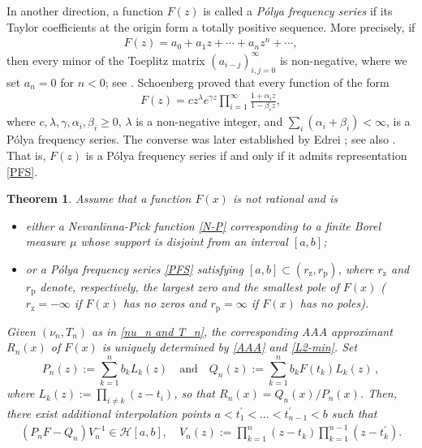 \documentclass[twoside,a4paper]{amsart}
\newtheorem{theorem}{Theorem}%
\theoremstyle{remark}
\begin{document}
In another direction, a function \( F(z) \) is called a \emph{P\'olya frequency series} if its Taylor coefficients at the origin form a totally positive sequence. More precisely, if
\begin{align}
\label{PFS-Taylor}
F(z) = a_0 + a_1z + \cdots + a_nz^n + \cdots,
\end{align}
then every minor of the Toeplitz matrix \( (a_{i-j})_{i,j=0}^\infty \) is non-negative, where we  set \( a_n=0\) for \( n<0\); see \cite{MR23309}. Schoenberg proved \cite{MR23309} that every function of the form
\begin{align}
\label{PFS}
F(z) = cz^\lambda e^{\gamma z}\prod_{i=1}^\infty \frac{1+\alpha_iz}{1-\beta_i z},
\end{align}
where \( c,\lambda,\gamma,\alpha_i,\beta_i\geq 0 \), \( \lambda \) is a non-negative integer, and \( \sum_i(\alpha_i+\beta_i)<\infty\), is a P\'olya frequency series. The converse  was later established by Edrei \cite{MR53176}; see also \cite{MR53174}. That is, \( F(z) \) is a P\'olya frequency series if and only if it admits representation \eqref{PFS}.

\begin{theorem}
\label{thm:1}
Assume that a function \( F(x) \) is not rational and is
\begin{itemize}
    \item [(i)] either a Nevanlinna-Pick function \eqref{N-P} corresponding to a finite Borel measure \( \mu \) whose support is disjoint from an interval \( [a,b] \);
    \item [(ii)] or a P\'olya frequency series  \eqref{PFS} satisfying \( [a,b]\subset (r_{\mathrm z},r_{\mathrm p}) \), where \( r_{\mathrm z} \) and \( r_{\mathrm p} \) denote, respectively, the largest zero and the smallest pole of \( F(x) \) (\( r_{\mathrm z}=-\infty \) if \( F(x)\) has no zeros and \( r_{\mathrm p}=\infty \) if \( F(x)\) has no poles).
\end{itemize}
Given \( (\nu_n,T_n) \) as in \eqref{nu_n and T_n}, the corresponding AAA approximant \( R_n(x) \) of \( F(x) \) is uniquely determined by \eqref{AAA} and \eqref{L2-min}. Set 
\[
P_n(z) := \sum_{k=1}^n b_k L_k(z) \quad \text{and} \quad Q_n(z) := \sum_{k=1}^n b_k F(t_k) L_k(z)\,,
\]
where \( L_k(z) := \prod_{i\neq k}(z-t_i) \), so that \( R_n(x)=Q_n(x)/P_n(x) \). Then, there exist additional interpolation points \( a<t_1^\prime<\ldots< t_{n-1}^\prime<b \) such that 
\begin{align}\label{cot1}
(P_nF-Q_n)V_n^{-1}\in\mathcal H[a,b], \quad V_n(z) := \prod_{k=1}^n(z-t_k)\prod_{k=1}^{n -1}(z-t_k^\prime).
\end{align}
\end{theorem}
\end{document}
